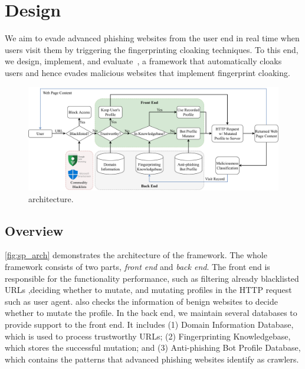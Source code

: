 \section{Design}


We aim to evade advanced phishing websites from the user end in real time when users visit them by triggering the fingerprinting cloaking techniques.
To this end, we design, implement, and evaluate~\spartacus, a framework that automatically cloaks users and hence evades malicious websites that implement fingerprint cloaking.

\begin{figure}
\centering
\includegraphics[width=\linewidth]{figs/arch.pdf}
\caption{\spartacus architecture.}
\label{fig:sp_arch}
\end{figure}

\subsection{Overview}
\autoref{fig:sp_arch} demonstrates the architecture of the \spartacus framework.
The whole framework consists of two parts, \emph{front end} and \emph{back end}. 
The front end is responsible for the functionality performance, such as filtering already blacklisted URLs ,deciding whether to mutate, and mutating profiles in the HTTP request such as user agent.
\spartacus also checks the information of benign websites to decide whether to mutate the profile.
In the back end, we maintain several databases to provide support to the front end.
It includes (1) Domain Information Database, which is used to process trustworthy URLs;
(2) Fingerprinting Knowledgebase, which stores the successful mutation;
and (3) Anti-phishing Bot Profile Database, which contains the patterns that advanced phishing websites identify as crawlers.

